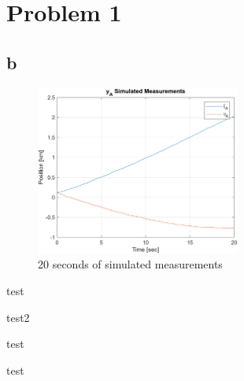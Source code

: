 
\section{Problem 1}
\subsection{b}
\lipsum[23-27]
\begin{figure}[h!tbp]
    \centering
    \includegraphics[width=0.6\textwidth]{figs/p2pa.png}
    \caption{20 seconds of simulated measurements}
    \label{fig:p2_a}
\end{figure}

\begin{definition}[test]
    test
\end{definition}

\begin{theorem}[test]
    test2
\end{theorem}

\begin{eg}[test]
    test
\end{eg}

\begin{remark}[test]
    test
\end{remark}